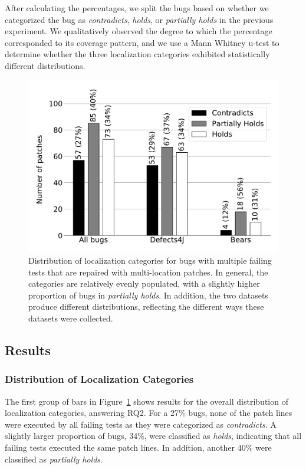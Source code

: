 \documentclass[10pt, conference]{IEEEtran}
\begin{document}
After calculating the percentages, we split the bugs based on whether we categorized the bug 
as \emph{contradicts}, \emph{holds}, or \emph{partially holds} in the previous experiment.
We qualitatively observed the degree to which the percentage corresponded to its coverage 
pattern, and we use a Mann Whitney u-test to determine whether the three localization 
categories exhibited statistically different distributions.


\begin{figure}
	\includegraphics[width=\linewidth]{img/coverage_hist_all.pdf}
	\caption{Distribution of localization categories for bugs with multiple failing
      tests that are repaired with multi-location patches. In general, the categories are relatively 
      evenly populated, with a slightly higher proportion of bugs in \emph{partially holds}. In 
      addition, the two datasets produce different distributions, reflecting the different 
      ways these datasets were collected.}
	\label{fig:coverage-all}
\end{figure}

\subsection{Results}

\subsubsection{Distribution of Localization Categories} \label{sec:cov_patterns}

The first group of bars in Figure~\ref{fig:coverage-all} shows results for the overall distribution 
of localization categories, 
answering RQ2. 
For a 27\% bugs, none of the patch lines were executed by all failing tests as they were 
categorized as \emph{contradicts}.  A slightly larger proportion of bugs, 34\%, were classified 
as 
\emph{holds}, indicating that all failing tests executed the same patch lines.
In addition, another 40\% were classified as \emph{partially holds}.
\end{document}
